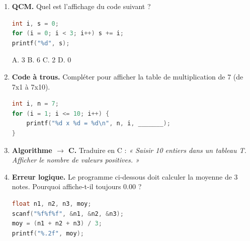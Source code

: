 \documentclass[11pt]{article}
\begin{document}
\begin{exercice}
\begin{enumerate}
\item \textbf{QCM.} Quel est l'affichage du code suivant ?
\begin{lstlisting}[language=C]
int i, s = 0;
for (i = 0; i < 3; i++) s += i;
printf("%d", s);
\end{lstlisting}
A. 3 \quad B. 6 \quad C. 2 \quad D. 0
\item \textbf{Code à trous.} Compléter pour afficher la table de multiplication de 7 (de 7x1 à 7x10).
\begin{lstlisting}[language=C]
int i, n = 7;
for (i = 1; i <= 10; i++) {
    printf("%d x %d = %d\n", n, i, _______);
}
\end{lstlisting}
\item \textbf{Algorithme $\to$ C.} Traduire en C : \emph{« Saisir 10 entiers dans un tableau T. Afficher le nombre de valeurs positives. »}
\item \textbf{Erreur logique.} Le programme ci-dessous doit calculer la moyenne de 3 notes. Pourquoi affiche-t-il toujours 0.00 ?
\begin{lstlisting}[language=C]
float n1, n2, n3, moy;
scanf("%f%f%f", &n1, &n2, &n3);
moy = (n1 + n2 + n3) / 3;
printf("%.2f", moy);
\end{lstlisting}
\end{enumerate}
\end{exercice}
\end{document}
